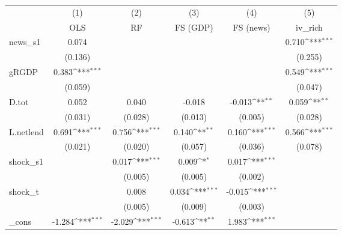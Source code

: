 {
\def\sym#1{\ifmmode^{#1}\else\(^{#1}\)\fi}
\begin{tabular}{l*{5}{c}}
\toprule
            &\multicolumn{1}{c}{(1)}&\multicolumn{1}{c}{(2)}&\multicolumn{1}{c}{(3)}&\multicolumn{1}{c}{(4)}&\multicolumn{1}{c}{(5)}\\
            &\multicolumn{1}{c}{OLS}&\multicolumn{1}{c}{RF}&\multicolumn{1}{c}{FS (GDP)}&\multicolumn{1}{c}{FS (news)}&\multicolumn{1}{c}{iv\_rich}\\
\midrule
news\_s1     &       0.074         &                     &                     &                     &       0.710\sym{***}\\
            &     (0.136)         &                     &                     &                     &     (0.255)         \\
\addlinespace
gRGDP       &       0.383\sym{***}&                     &                     &                     &       0.549\sym{***}\\
            &     (0.059)         &                     &                     &                     &     (0.047)         \\
\addlinespace
D.tot       &       0.052         &       0.040         &      -0.018         &      -0.013\sym{**} &       0.059\sym{**} \\
            &     (0.031)         &     (0.028)         &     (0.013)         &     (0.005)         &     (0.028)         \\
\addlinespace
L.netlend   &       0.691\sym{***}&       0.756\sym{***}&       0.140\sym{**} &       0.160\sym{***}&       0.566\sym{***}\\
            &     (0.021)         &     (0.020)         &     (0.057)         &     (0.036)         &     (0.078)         \\
\addlinespace
shock\_s1    &                     &       0.017\sym{***}&       0.009\sym{*}  &       0.017\sym{***}&                     \\
            &                     &     (0.005)         &     (0.005)         &     (0.002)         &                     \\
\addlinespace
shock\_t     &                     &       0.008         &       0.034\sym{***}&      -0.015\sym{***}&                     \\
            &                     &     (0.005)         &     (0.009)         &     (0.003)         &                     \\
\addlinespace
\_cons      &      -1.284\sym{***}&      -2.029\sym{***}&      -0.613\sym{**} &       1.983\sym{***}&                     \\

\end{tabular}}
